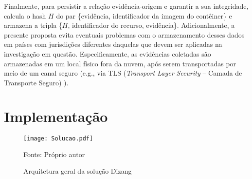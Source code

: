 Finalmente, para persistir a relação evidência-origem e garantir a sua integridade, \fancyname calcula o hash $H$ do par \{evidência, identificador da imagem do contêiner\} e armazena a tripla \{$H$, identificador do recurso, evidência\}.
%
Adicionalmente, a presente proposta evita eventuais problemas com o armazenamento desses dados em países com jurisdições diferentes daquelas que devem ser aplicadas na investigação em questão.
%
Especificamente, as evidências coletadas são armazenadas em um local físico fora da nuvem, após serem transportadas por meio de um canal seguro (e.g., via TLS (\textit{Transport Layer Security} -- Camada de Transporte Seguro) \cite{DierksT2008}).
%

\section{Implementação}
\label{sec:proposta-impl}


\begin{figure}[htb!]
\footnotesize
\caption{Arquitetura geral da solução Dizang}
\texttt{[image: Solucao.pdf]}
\centering
\label{fig:Solucao}
\begin{center}
Fonte: Próprio autor 
\end{center}
\end{figure}

